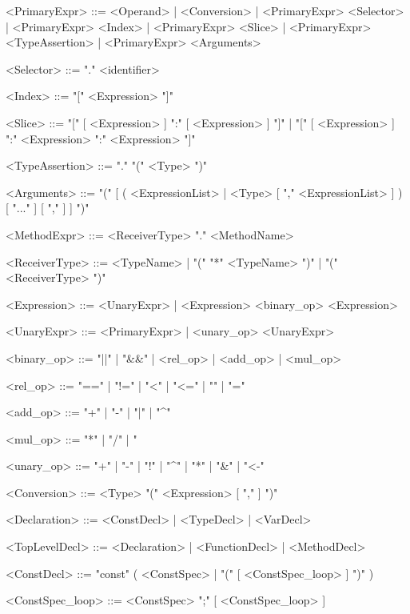 \begin{grammar}
    <PrimaryExpr>       ::=     <Operand>
                        |       <Conversion>
                        |       <PrimaryExpr> <Selector>
                        |       <PrimaryExpr> <Index>
                        |       <PrimaryExpr> <Slice>
                        |       <PrimaryExpr> <TypeAssertion>
                        |       <PrimaryExpr> <Arguments>

    <Selector>          ::=     "." <identifier>

    <Index>             ::=     "[" <Expression> "]"

    <Slice>             ::=     "[" [ <Expression> ] ":" [ <Expression> ] "]"
                        |       "[" [ <Expression> ] ":" <Expression> ":" <Expression> "]"

    <TypeAssertion>     ::=     "." "(" <Type> ")"

    <Arguments>         ::=     "(" [ ( <ExpressionList> | <Type> [ "," <ExpressionList> ] ) [ "..." ] [ "," ] ] ")"

    <MethodExpr>        ::=     <ReceiverType> "." <MethodName>

    <ReceiverType>      ::=     <TypeName> | "(" "*" <TypeName> ")" | "(" <ReceiverType> ")"

    <Expression>        ::=     <UnaryExpr> | <Expression> <binary_op> <Expression>

    <UnaryExpr>         ::=     <PrimaryExpr> | <unary_op> <UnaryExpr>

    <binary_op>         ::=     "||" | "&&" | <rel_op> | <add_op> | <mul_op>

    <rel_op>            ::=     "==" | "!=" | "<" | "<=" | "\>" | "\>="

    <add_op>            ::=     "+" | "-" | "|" | "^"

    <mul_op>            ::=     "*" | "/" | "%

    <unary_op>          ::=     "+" | "-" | "!" | "^" | "*" | "&" | "<-"

    <Conversion>        ::=     <Type> "(" <Expression> [ "," ] ")"


    <Declaration>       ::=     <ConstDecl> | <TypeDecl> | <VarDecl>

    <TopLevelDecl>      ::=     <Declaration> | <FunctionDecl> | <MethodDecl>

    <ConstDecl>         ::=     "const" ( <ConstSpec> | "(" [ <ConstSpec_loop> ] ")" )

    <ConstSpec_loop>    ::=     <ConstSpec> ";" [ <ConstSpec_loop> ]


\end{grammar}
